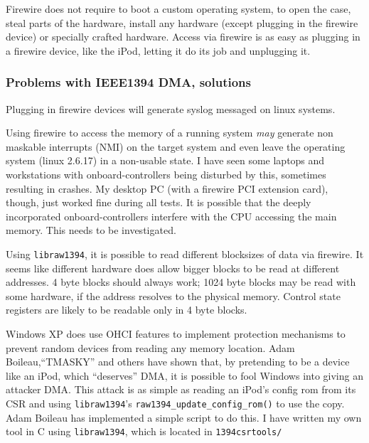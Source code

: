 Firewire does not require to boot a custom operating system, to open the case,
steal parts of the hardware, install any hardware (except plugging in the
firewire device) or specially crafted hardware.  Access via firewire is as easy
as plugging in a firewire device, like the iPod, letting it do its job and
unplugging it.




\subsubsection{Problems with IEEE1394 DMA, solutions}

Plugging in firewire devices will generate syslog messaged on linux systems.

Using firewire to access the memory of a running system \emph{may} generate non
maskable interrupts (NMI) on the target system and even leave the operating
system (linux 2.6.17) in a non-usable state. I have seen some laptops and
workstations with onboard-controllers being disturbed by this, sometimes
resulting in crashes. My desktop PC (with a firewire PCI extension card),
though, just worked fine during all tests. It is possible that the deeply
incorporated onboard-controllers interfere with the CPU accessing the main
memory. This needs to be investigated.


Using \texttt{libraw1394}, it is possible to read different blocksizes of data
via firewire.  It seems like different hardware does allow bigger blocks to be
read at different addresses. 4 byte blocks should always work; 1024 byte blocks
may be read with some hardware, if the address resolves to the physical memory.
Control state registers are likely to be readable only in 4 byte blocks.

\label{windows-dma} Windows XP does use OHCI features to implement protection
mechanisms to prevent random devices from reading any memory location.  Adam
Boileau,``TMASKY'' and others have shown \cite{rux2k6firewire:2006} that, by
pretending to be a device like an iPod, which ``deserves'' DMA, it is possible
to fool Windows into giving an attacker DMA.  This attack is as simple as
reading an iPod's config rom from its CSR and using \texttt{libraw1394}'s
\texttt{raw1394\_update\_config\_rom()} to use the copy.  Adam Boileau has
implemented a simple script to do this. I have written my own tool in C using
\texttt{libraw1394}, which is located in \texttt{1394csrtools/}



